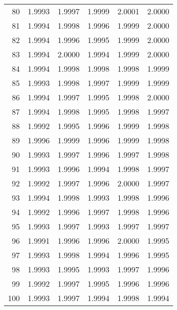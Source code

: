 \begin{tabular}{r*5c}
80 &1.9993 &1.9997 &1.9999 &2.0001 &2.0000\\
81 &1.9994 &1.9998 &1.9996 &1.9999 &2.0000\\
82 &1.9994 &1.9996 &1.9995 &1.9999 &2.0000\\
83 &1.9994 &2.0000 &1.9994 &1.9999 &2.0000\\
84 &1.9994 &1.9998 &1.9998 &1.9998 &1.9999\\
85 &1.9993 &1.9998 &1.9997 &1.9999 &1.9999\\
86 &1.9994 &1.9997 &1.9995 &1.9998 &2.0000\\
87 &1.9994 &1.9998 &1.9995 &1.9998 &1.9997\\
88 &1.9992 &1.9995 &1.9996 &1.9999 &1.9998\\
89 &1.9996 &1.9999 &1.9996 &1.9999 &1.9998\\
90 &1.9993 &1.9997 &1.9996 &1.9997 &1.9998\\
91 &1.9993 &1.9996 &1.9994 &1.9998 &1.9997\\
92 &1.9992 &1.9997 &1.9996 &2.0000 &1.9997\\
93 &1.9994 &1.9998 &1.9993 &1.9998 &1.9996\\
94 &1.9992 &1.9996 &1.9997 &1.9998 &1.9996\\
95 &1.9993 &1.9997 &1.9993 &1.9997 &1.9997\\
96 &1.9991 &1.9996 &1.9996 &2.0000 &1.9995\\
97 &1.9993 &1.9998 &1.9994 &1.9996 &1.9995\\
98 &1.9993 &1.9995 &1.9993 &1.9997 &1.9996\\
99 &1.9992 &1.9997 &1.9995 &1.9996 &1.9996\\
100 &1.9993 &1.9997 &1.9994 &1.9998 &1.9994
\end{tabular}
